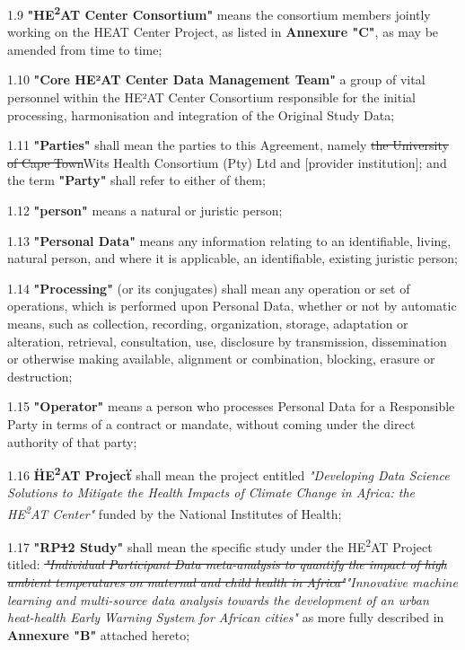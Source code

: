 \documentclass[12pt,letterpaper]{article}
\newcommand{\deleted}[1]{\textcolor{deletecolor}{\sout{#1}}}
\newcommand{\added}[1]{\textcolor{addcolor}{#1}}
\begin{document}
1.9 \textbf{"HE\textsuperscript{2}AT Center Consortium"} means the consortium members jointly working on the HEAT Center Project, as listed in \textbf{Annexure "C"}, as may be amended from time to time;

1.10 \textbf{"Core HE²AT Center Data Management Team"} a group of \added{vital} personnel within the HE²AT Center Consortium responsible for the initial processing, harmonisation and integration of the Original Study Data;

1.11 \textbf{"Parties"} shall mean the parties to this Agreement, namely \deleted{the University of Cape Town}\added{Wits Health Consortium (Pty) Ltd} and [provider institution]; and the term \textbf{"Party"} shall refer to either of them;

1.12 \textbf{"person"} means a natural or juristic person;

1.13 \textbf{"Personal Data"} means any information relating to an identifiable, living, natural person, and where it is applicable, an identifiable, existing juristic person;

1.14 \textbf{"Processing"} (or its conjugates) shall mean any operation or set of operations, which is performed upon Personal Data, whether or not by automatic means, such as collection, recording, organization, storage, adaptation or alteration, retrieval, consultation, use, disclosure by transmission, dissemination or otherwise making available, alignment or combination, blocking, erasure or destruction;

1.15 \textbf{"Operator"} means a person who processes Personal Data for a Responsible Party in terms of a contract or mandate, without coming under the direct authority of that party;

1.16 \textbf{\"HE\textsuperscript{2}AT Project\"} shall mean the project entitled \textit{"Developing Data Science Solutions to Mitigate the Health Impacts of Climate Change in Africa: the HE\textsuperscript{2}AT Center"} funded by the National Institutes of Health;

1.17 \textbf{"RP\deleted{1}\added{2} Study"} shall mean the specific study under the HE\textsuperscript{2}AT Project titled: \deleted{\textit{"Individual Participant Data meta-analysis to quantify the impact of high ambient temperatures on maternal and child health in Africa"}}\added{\textit{"Innovative machine learning and multi-source data analysis towards the development of an urban heat-health Early Warning System for African cities"}} as more fully described in \textbf{Annexure "B"} attached hereto;
\end{document}
